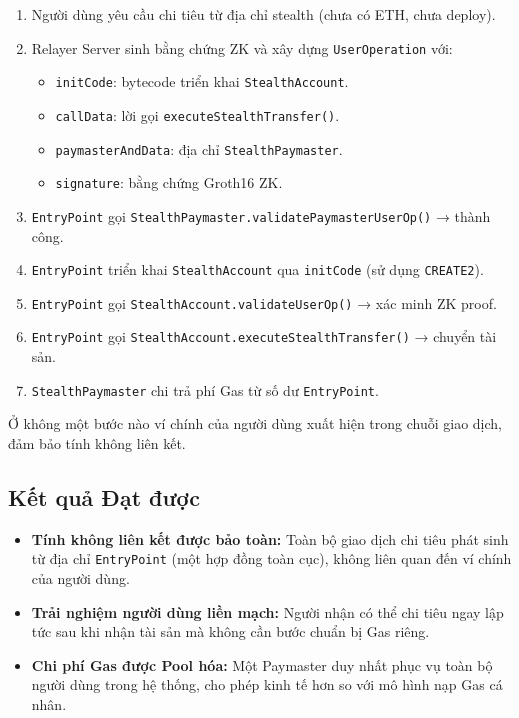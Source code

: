 \documentclass[../DoAn.tex]{subfiles}
\begin{document}
\begin{enumerate}
    \item Người dùng yêu cầu chi tiêu từ địa chỉ stealth (chưa có ETH, chưa deploy).
    \item Relayer Server sinh bằng chứng ZK và xây dựng \texttt{UserOperation} với:
        \begin{itemize}
            \item \texttt{initCode}: bytecode triển khai \texttt{StealthAccount}.
            \item \texttt{callData}: lời gọi \texttt{executeStealthTransfer()}.
            \item \texttt{paymasterAndData}: địa chỉ \texttt{StealthPaymaster}.
            \item \texttt{signature}: bằng chứng Groth16 ZK.
        \end{itemize}
    \item \texttt{EntryPoint} gọi \texttt{StealthPaymaster.validatePaymasterUserOp()} → thành công.
    \item \texttt{EntryPoint} triển khai \texttt{StealthAccount} qua \texttt{initCode} (sử dụng \texttt{CREATE2}).
    \item \texttt{EntryPoint} gọi \texttt{StealthAccount.validateUserOp()} → xác minh ZK proof.
    \item \texttt{EntryPoint} gọi \texttt{StealthAccount.executeStealthTransfer()} → chuyển tài sản.
    \item \texttt{StealthPaymaster} chi trả phí Gas từ số dư \texttt{EntryPoint}.
\end{enumerate}

Ở không một bước nào ví chính của người dùng xuất hiện trong chuỗi giao dịch, đảm bảo tính không liên kết.

\subsection{Kết quả Đạt được}
\label{subsec:cold_start_result}

\begin{itemize}
    \item \textbf{Tính không liên kết được bảo toàn:} Toàn bộ giao dịch chi tiêu phát sinh từ địa chỉ \texttt{EntryPoint} (một hợp đồng toàn cục), không liên quan đến ví chính của người dùng.
    \item \textbf{Trải nghiệm người dùng liền mạch:} Người nhận có thể chi tiêu ngay lập tức sau khi nhận tài sản mà không cần bước chuẩn bị Gas riêng.
    \item \textbf{Chi phí Gas được Pool hóa:} Một Paymaster duy nhất phục vụ toàn bộ người dùng trong hệ thống, cho phép kinh tế hơn so với mô hình nạp Gas cá nhân.
\end{itemize}
\end{document}
